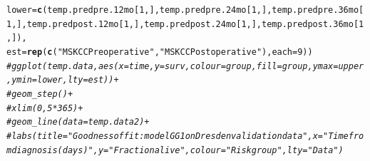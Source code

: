 \documentclass{article}\usepackage[]{graphicx}\usepackage[]{color}
\makeatletter
\newcommand{\hlnum}[1]{\textcolor[rgb]{0.686,0.059,0.569}{#1}}%
\newcommand{\hlstr}[1]{\textcolor[rgb]{0.192,0.494,0.8}{#1}}%
\newcommand{\hlcom}[1]{\textcolor[rgb]{0.678,0.584,0.686}{\textit{#1}}}%
\newcommand{\hlstd}[1]{\textcolor[rgb]{0.345,0.345,0.345}{#1}}%
\newcommand{\hlkwc}[1]{\textcolor[rgb]{0.333,0.667,0.333}{#1}}%
\newcommand{\hlkwd}[1]{\textcolor[rgb]{0.737,0.353,0.396}{\textbf{#1}}}%
\newenvironment{kframe}{%
 \def\at@end@of@kframe{}%
 \ifinner\ifhmode%
  \def\at@end@of@kframe{\end{minipage}}%
  \begin{minipage}{\columnwidth}%
 \fi\fi%
 \def\FrameCommand##1{\hskip\@totalleftmargin \hskip-\fboxsep
 \colorbox{shadecolor}{##1}\hskip-\fboxsep
     \hskip-\linewidth \hskip-\@totalleftmargin \hskip\columnwidth}%
 \MakeFramed {\advance\hsize-\width
   \@totalleftmargin\z@ \linewidth\hsize
   \@setminipage}}%
 {\par\unskip\endMakeFramed%
 \at@end@of@kframe}
\newenvironment{knitrout}{}{} %
\makeatother
\begin{document}
\begin{knitrout}
\begin{kframe}
\begin{alltt}
        \hlkwc{lower} \hlstd{=} \hlkwd{c}\hlstd{(temp.predpre.12mo[}\hlnum{1}\hlstd{,], temp.predpre.24mo[}\hlnum{1}\hlstd{,], temp.predpre.36mo[}\hlnum{1}\hlstd{,], temp.predpost.12mo[}\hlnum{1}\hlstd{,], temp.predpost.24mo[}\hlnum{1}\hlstd{,], temp.predpost.36mo[}\hlnum{1}\hlstd{,]),}
        \hlkwc{est} \hlstd{=} \hlkwd{rep}\hlstd{(}\hlkwd{c}\hlstd{(}\hlstr{"MSKCC Preoperative"}\hlstd{,} \hlstr{"MSKCC Postoperative"}\hlstd{),} \hlkwc{each} \hlstd{=} \hlnum{9}\hlstd{))}
\hlcom{# ggplot(temp.data, aes(x = time, y = surv, colour = group, fill = group, ymax = upper, ymin = lower, lty = est)) + }
\hlcom{# 	geom_step() + }
\hlcom{# 	xlim(0, 5*365) + }
\hlcom{# 	geom_line(data = temp.data2) + }
\hlcom{# 	labs(title = "Goodness of fit: model GG1 on Dresden validation data", x = "Time from diagnosis (days)", y = "Fraction alive", colour = "Risk group", lty = "Data")}


\end{alltt}
\end{kframe}
\end{knitrout}
\end{document}
